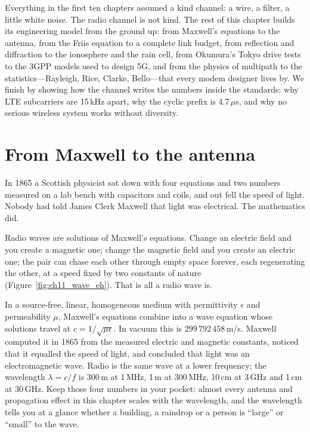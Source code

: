 Everything in the first ten chapters assumed a kind channel: a wire, a filter, a little white
noise. The radio channel is not kind. The rest of this chapter builds its engineering model from
the ground up: from Maxwell's equations to the antenna, from the Friis equation to a complete
link budget, from reflection and diffraction to the ionosphere and the rain cell, from Okumura's
Tokyo drive tests to the 3GPP models used to design 5G, and from the physics of multipath to the
statistics---Rayleigh, Rice, Clarke, Bello---that every modem designer lives by. We finish by
showing how the channel writes the numbers inside the standards: why LTE subcarriers are
15\,kHz apart, why the cyclic prefix is 4.7\,$\mu$s, and why no serious wireless system works
without diversity.

\section{From Maxwell to the antenna}
\label{sec:ch11:maxwell}

In 1865 a Scottish physicist sat down with four equations and two numbers measured on a lab bench
with capacitors and coils, and out fell the speed of light. Nobody had told James Clerk Maxwell
that light was electrical. The mathematics did.

Radio waves are solutions of Maxwell's equations. Change an electric field and you create a
magnetic one; change the magnetic field and you create an electric one; the pair can chase each
other through empty space forever, each regenerating the other, at a speed fixed by two constants
of nature (Figure~\ref{fig:ch11_wave_eh}). That is all a radio wave is.


In a source-free, linear, homogeneous medium with permittivity $\epsilon$ and permeability
$\mu$, Maxwell's equations combine into a wave equation whose solutions travel at
$c=1/\sqrt{\mu\epsilon}$. In vacuum this is $299\,792\,458$\,m/s. Maxwell computed it in 1865
from the measured electric and magnetic constants, noticed that it equalled the speed of light,
and concluded that light was an electromagnetic wave. Radio is the same wave at a lower
frequency; the wavelength $\lambda=c/f$ is 300\,m at 1\,MHz, 1\,m at 300\,MHz, 10\,cm at 3\,GHz
and 1\,cm at 30\,GHz. Keep those four numbers in your pocket: almost every antenna and
propagation effect in this chapter scales with the wavelength, and the wavelength tells you at a
glance whether a building, a raindrop or a person is ``large'' or ``small'' to the wave.


